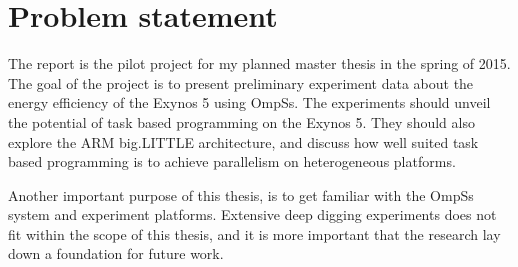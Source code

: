 \section*{Problem statement}
The report is the pilot project for my planned master thesis in the spring of 2015.
The goal of the project is to present preliminary experiment data about the energy efficiency of the Exynos 5 using OmpSs.
The experiments should unveil the potential of task based programming on the Exynos 5.
They should also explore the ARM big.LITTLE architecture, and discuss how well suited task based programming is to achieve parallelism on heterogeneous platforms.

Another important purpose of this thesis, is to get familiar with the OmpSs system and experiment platforms.
Extensive deep digging experiments does not fit within the scope of this thesis, and it is more important that the research lay down a foundation for future work.
